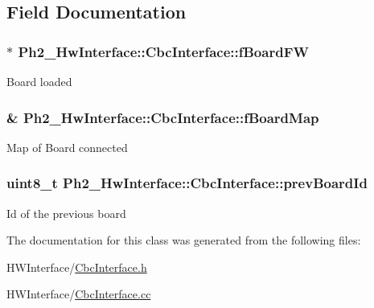 \subsection{Field Documentation}
\hypertarget{class_ph2___hw_interface_1_1_cbc_interface_a8c37c0f580a1918fc11a207aff085a72}{
\subsubsection[{f\-Board\-F\-W}]{$\ast$ Ph2\-\_\-\-Hw\-Interface\-::\-Cbc\-Interface\-::f\-Board\-F\-W\hspace{0.3cm}{\ttfamily [private]}}}\label{class_ph2___hw_interface_1_1_cbc_interface_a8c37c0f580a1918fc11a207aff085a72}
Board loaded \hypertarget{class_ph2___hw_interface_1_1_cbc_interface_a0e34094468be36ee2c65e15f72178303}{
\subsubsection[{f\-Board\-Map}]{\& Ph2\-\_\-\-Hw\-Interface\-::\-Cbc\-Interface\-::f\-Board\-Map\hspace{0.3cm}{\ttfamily [private]}}}\label{class_ph2___hw_interface_1_1_cbc_interface_a0e34094468be36ee2c65e15f72178303}
Map of Board connected \hypertarget{class_ph2___hw_interface_1_1_cbc_interface_ad4c28eff1e453e9954445f9fe02c16b6}{
\subsubsection[{prev\-Board\-Id}]{\setlength{\rightskip}{0pt plus 5cm}uint8\-\_\-t Ph2\-\_\-\-Hw\-Interface\-::\-Cbc\-Interface\-::prev\-Board\-Id\hspace{0.3cm}{\ttfamily [private]}}}\label{class_ph2___hw_interface_1_1_cbc_interface_ad4c28eff1e453e9954445f9fe02c16b6}
Id of the previous board 

The documentation for this class was generated from the following files\-:\begin{DoxyCompactItemize}
\item 
H\-W\-Interface/\hyperlink{_cbc_interface_8h}{Cbc\-Interface.\-h}\item 
H\-W\-Interface/\hyperlink{_cbc_interface_8cc}{Cbc\-Interface.\-cc}\end{DoxyCompactItemize}
